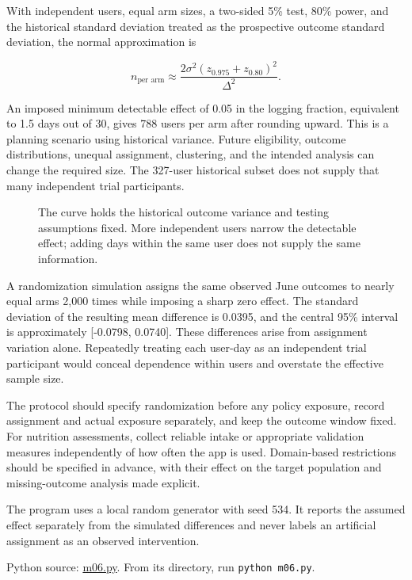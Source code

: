 With independent users, equal arm sizes, a two-sided 5\% test, 80\%
power, and the historical standard deviation treated as the prospective
outcome standard deviation, the normal approximation is

\[
n_{\text{per arm}}\approx
\frac{2\sigma^2(z_{0.975}+z_{0.80})^2}{\Delta^2}.
\]

An imposed minimum detectable effect of 0.05 in the logging fraction,
equivalent to 1.5 days out of 30, gives 788 users per arm after rounding
upward. This is a planning scenario using historical variance. Future
eligibility, outcome distributions, unequal assignment, clustering, and
the intended analysis can change the required size. The 327-user
historical subset does not supply that many independent trial
participants.

\begin{figure}[htbp]
\centering

\caption{The curve holds the historical outcome variance and testing assumptions fixed. More independent users narrow the detectable effect; adding days within the same user does not supply the same information.}\label{fig:M06_mhealth_precision}
\end{figure}

A randomization simulation assigns the same observed June outcomes to
nearly equal arms 2,000 times while imposing a sharp zero effect. The
standard deviation of the resulting mean difference is 0.0395, and the
central 95\% interval is approximately {[}-0.0798, 0.0740{]}. These
differences arise from assignment variation alone. Repeatedly treating
each user-day as an independent trial participant would conceal
dependence within users and overstate the effective sample size.

The protocol should specify randomization before any policy exposure,
record assignment and actual exposure separately, and keep the outcome
window fixed. For nutrition assessments, collect reliable intake or
appropriate validation measures independently of how often the app is
used. Domain-based restrictions should be specified in advance, with
their effect on the target population and missing-outcome analysis made
explicit.

The program uses a local random generator with seed 534. It reports the
assumed effect separately from the simulated differences and never
labels an artificial assignment as an observed intervention.

\FloatBarrier
{}
Python source:
\href{../03_Data_and_Code/mHealth/recurring_examples/m06.py}{m06.py}.
From its directory, run \texttt{python\ m06.py}.

